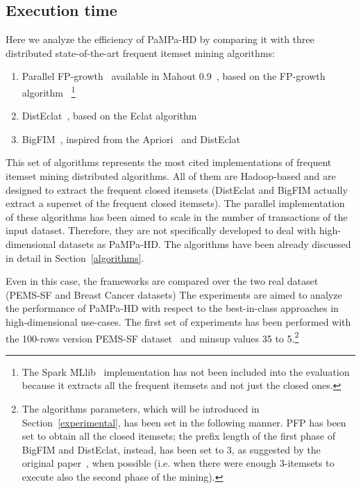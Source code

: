 \subsection{Execution time}\label{running_time}
Here we analyze the efficiency of PaMPa-HD by comparing it 
with three distributed state-of-the-art frequent itemset mining algorithms:

\begin{enumerate}

\item Parallel FP-growth~\cite{pfpgrowth} 
available in Mahout 0.9~\cite{mahout2}, 
based on the FP-growth algorithm~\cite{Han00} \footnote{The Spark MLlib~\cite{citeulike:13636750} implementation has not been included into the evaluation because it extracts all the frequent itemsets and not just the closed ones.}

\item DistEclat~\cite{bigfim}, based on the Eclat algorithm~\cite{Zaki97newalgorithms}

\item BigFIM~\cite{bigfim}, inspired from the Apriori~\cite{Agr94} and DistEclat
\end{enumerate}

This set of algorithms represents the most cited implementations 
of frequent itemset mining distributed algorithms. 
All of them are Hadoop-based and are designed to extract 
the frequent closed itemsets 
(DistEclat and BigFIM actually extract a superset of the frequent closed itemsets).
The parallel implementation of these algorithms has been aimed to scale in the number of transactions of the input dataset. Therefore, they are not specifically developed to deal with
high-dimensional datasets as PaMPa-HD.
The algorithms have been already discussed in detail in Section~\ref{algorithms}.

Even in this case, the frameworks are compared over the two real dataset (PEMS-SF and Breast Cancer datasets) The experiments are aimed to analyze the performance of PaMPa-HD with respect to the best-in-class approaches in high-dimensional use-cases. 
The first set of experiments has been performed with the 100-rows version PEMS-SF dataset~\cite{uci} and minsup values 35 to 5.\footnote{The algorithms parameters, which will be introduced in Section~\ref{experimental}, has been set in the following manner. PFP has been set to obtain all the closed itemsets; the prefix length of the first phase of BigFIM and DistEclat, instead, has been set to 3, as suggested by the original paper~\cite{bigfim}, when possible (i.e. when there were enough 3-itemsets to execute also the second phase of the mining).}

